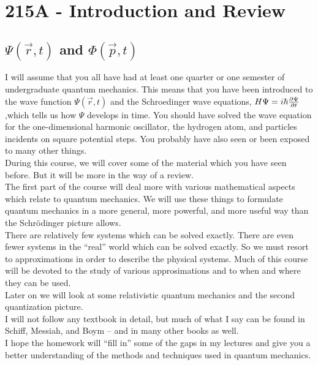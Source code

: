 \section{215A - Introduction and Review}

\subsection{$\Psi(\vec{r},t)$  and $\Phi(\vec{p},t)$ }
I will assume that you all have had at least one quarter or one semester of undergraduate quantum mechanics.
This means that you have been introduced to the wave function $\Psi(\vec r,t)$ and the Schroedinger wave equations, 
$H\Psi = i\hbar {\partial \Psi\over \partial t}$,which tells us how $\Psi$ develops in time. You should have solved the wave
equation for the one-dimensional harmonic oscillator, the hydrogen atom, and particles incidents on square potential steps.
You probably have also seen or been exposed to many other things.\\

During this course, we will cover some of the material which you have seen before. But it will be more in the way of a review.\\

The first part of the course will deal more with various mathematical aspects which relate to quantum mechanics. We will use these things to 
formulate quantum mechanics in a more general, more powerful, and more useful way than the Schr\"odinger picture allows.\\

There are relatively few systems which can be solved exactly. There are even fewer systems in the ``real'' world which can 
be solved exactly. So we must resort to approximations in order to describe the physical systems. Much of this course will 
be devoted to the study of various approsimations and to when and where they can be used. \\

Later on we will look at some relativistic quantum mechanics and the second quantization picture.\\ 

I will not follow any textbook in detail, but much of what I say can be found in Schiff, Messiah, and Boym -- and in many other books as well.\\

I hope the homework will ``fill in'' some of the gaps in my lectures and give you a better understanding of the methods and techniques used
in quantum mechanics.
 

